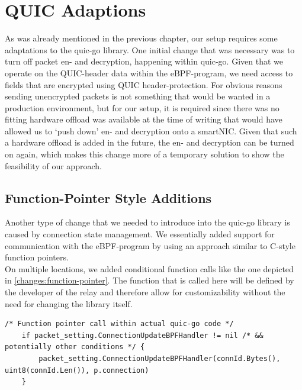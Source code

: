 \section{QUIC Adaptions}\label{sec:quic_adaptions}
As was already mentioned in the previous chapter, our setup requires some adaptations
to the quic-go library.
One initial change that was necessary was to turn off packet en- and decryption, 
happening within quic-go.
Given that we operate on the QUIC-header data within the eBPF-program, we need access 
to fields that are encrypted using QUIC header-protection.
For obvious reasons sending unencrypted packets is not something that would be wanted in 
a production environment, but for our setup, it is required since there was no fitting hardware offload 
was available at the time of writing that would have allowed us to `push down' en- and decryption 
onto a smartNIC\@.
Given that such a hardware offload is added in the future, the en- and decryption can be
turned on again, which makes this change more of a temporary solution to show the feasibility
of our approach.

\subsection{Function-Pointer Style Additions}
Another type of change that we needed to introduce into the quic-go library is caused by 
connection state management.
We essentially added support for communication with the eBPF-program by using an 
approach similar to C-style function pointers.
\\
On multiple locations, we added conditional function calls like the one depicted in 
\autoref{changes:function-pointer}.
The function that is called here will be defined by the developer of the relay and 
therefore allow for customizability without the need for changing the library itself.

\vspace{0.5cm}
\noindent\begin{minipage}{\textwidth}
\begin{lstlisting}[style=GoStyle, label=changes:function-pointer, caption=An example of a function-pointer addition to the quic-go library.]
    /* Function pointer call within actual quic-go code */
    if packet_setting.ConnectionUpdateBPFHandler != nil /* && potentially other conditions */ {
	    packet_setting.ConnectionUpdateBPFHandler(connId.Bytes(), uint8(connId.Len()), p.connection)
	}
\end{lstlisting}
\end{minipage}

